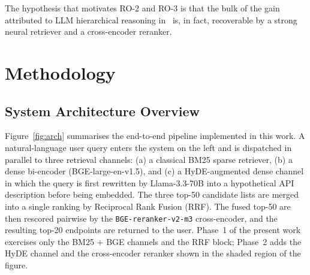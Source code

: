 \documentclass[10pt,a4paper,twocolumn]{article}
\begin{document}
\noindent
The hypothesis that motivates RO-2 and RO-3 is that the bulk of the
gain attributed to LLM hierarchical reasoning in~\cite{li2025llm} is,
in fact, recoverable by a strong neural retriever and a cross-encoder
reranker.

\section{Methodology}\label{sec:method}

\subsection{System Architecture Overview}

Figure~\ref{fig:arch} summarises the end-to-end pipeline implemented in
this work. A natural-language user query enters the system on the left
and is dispatched in parallel to three retrieval channels: (a) a
classical BM25 sparse retriever, (b) a dense bi-encoder
(BGE-large-en-v1.5), and (c) a HyDE-augmented dense channel in which
the query is first rewritten by Llama-3.3-70B into a hypothetical API
description before being embedded. The three top-50 candidate lists
are merged into a single ranking by Reciprocal Rank Fusion (RRF). The
fused top-50 are then rescored pairwise by the
\texttt{BGE-reranker-v2-m3} cross-encoder, and the resulting top-20
endpoints are returned to the user. Phase~1 of the present work
exercises only the BM25 + BGE channels and the RRF block; Phase~2
adds the HyDE channel and the cross-encoder reranker shown in the
shaded region of the figure.
\end{document}
